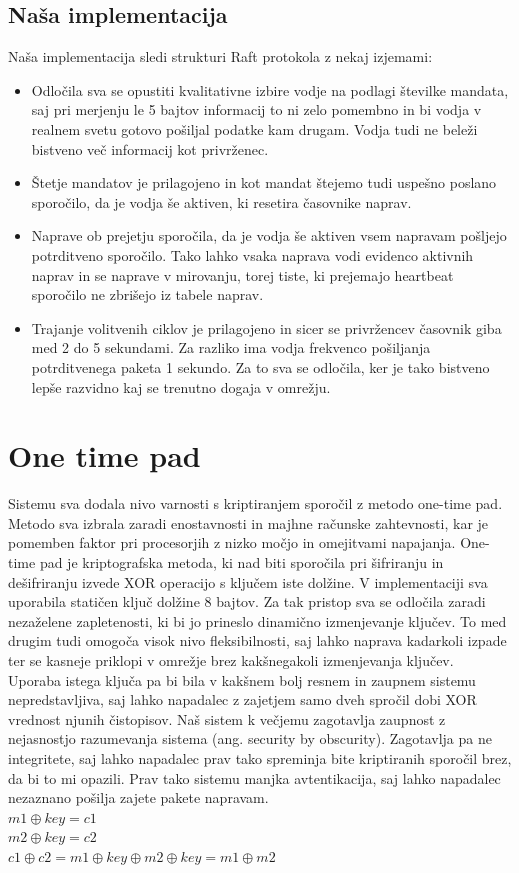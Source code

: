 \documentclass[runningheads]{llncs}
\begin{document}
\subsection{Naša implementacija}
Naša implementacija sledi strukturi Raft protokola z nekaj izjemami: \\
\begin{itemize}
\item Odločila sva se opustiti kvalitativne izbire vodje na podlagi številke mandata, saj pri merjenju le 5 bajtov informacij to ni zelo pomembno in bi vodja v realnem svetu gotovo pošiljal podatke kam drugam. Vodja tudi ne beleži bistveno več informacij kot privrženec.
\item Štetje mandatov je prilagojeno in kot mandat štejemo tudi uspešno poslano sporočilo, da je vodja še aktiven, ki resetira časovnike naprav.
\item Naprave ob prejetju sporočila, da je vodja še aktiven vsem napravam pošljejo potrditveno sporočilo. Tako lahko vsaka naprava vodi evidenco aktivnih naprav in se naprave v mirovanju, torej tiste, ki prejemajo heartbeat sporočilo ne zbrišejo iz tabele naprav.
\item Trajanje volitvenih ciklov je prilagojeno in sicer se privržencev časovnik giba med 2 do 5 sekundami. Za razliko ima vodja frekvenco pošiljanja potrditvenega paketa 1 sekundo. Za to sva se odločila, ker je tako bistveno lepše razvidno kaj se trenutno dogaja v omrežju.
\end{itemize}


\section{One time pad}
Sistemu sva dodala nivo varnosti s kriptiranjem sporočil z metodo one-time pad. Metodo sva izbrala zaradi  enostavnosti in majhne računske zahtevnosti, kar je pomemben faktor pri procesorjih z nizko močjo in omejitvami napajanja. One-time pad je kriptografska metoda, ki nad biti sporočila pri šifriranju in dešifriranju izvede XOR operacijo s ključem iste dolžine. V implementaciji sva uporabila statičen ključ dolžine 8 bajtov. Za tak pristop sva se odločila zaradi nezaželene zapletenosti, ki bi jo prineslo dinamično izmenjevanje ključev. To med drugim tudi omogoča visok nivo fleksibilnosti, saj lahko naprava kadarkoli izpade ter se kasneje priklopi v omrežje brez kakšnegakoli izmenjevanja ključev. \\
Uporaba istega ključa pa bi bila v kakšnem bolj resnem in zaupnem sistemu nepredstavljiva, saj lahko napadalec z zajetjem samo dveh spročil dobi XOR vrednost njunih čistopisov. Naš sistem k večjemu zagotavlja zaupnost z nejasnostjo razumevanja sistema (ang. security by obscurity). Zagotavlja pa ne integritete, saj lahko napadalec prav tako spreminja bite kriptiranih sporočil brez, da bi to mi opazili. Prav tako sistemu manjka avtentikacija, saj lahko napadalec nezaznano pošilja zajete pakete napravam. \\
$m1 \oplus key = c1$\\
$m2 \oplus key = c2$\\
$c1 \oplus c2 = m1 \oplus key \oplus m2 \oplus key = m1 \oplus m2 $ 
\end{document}
